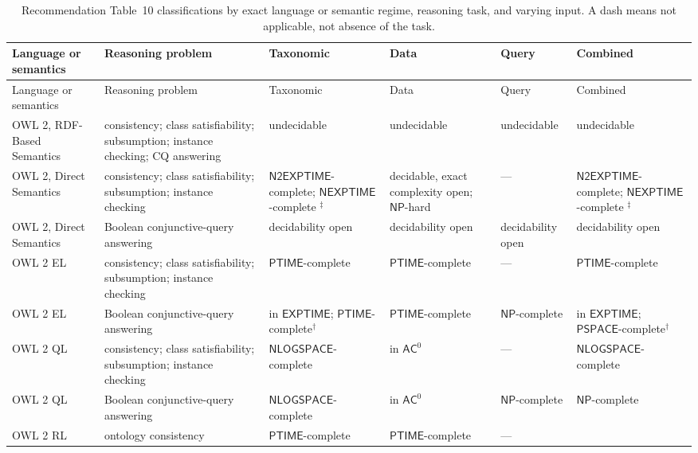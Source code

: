 \begingroup\scriptsize
\begin{longtable}{@{}p{}p{}p{}p{}p{}p{}@{}}
\caption{Recommendation Table~10 classifications by exact language or semantic
regime, reasoning task, and varying input.  A dash means not applicable, not
absence of the task.}\label{tab:p09-owl-profile-complexity}\\
\toprule
Language or semantics & Reasoning problem & Taxonomic & Data & Query & Combined \\
\midrule
\endfirsthead
\toprule
Language or semantics & Reasoning problem & Taxonomic & Data & Query & Combined \\
\midrule
\endhead
OWL 2, RDF-Based Semantics &
consistency; class satisfiability; subsumption; instance checking; CQ answering &
undecidable & undecidable & undecidable & undecidable \\
\addlinespace
OWL 2, Direct Semantics &
consistency; class satisfiability; subsumption; instance checking &
\(\mathsf{N2EXPTIME}\)-complete; \(\mathsf{NEXPTIME}\)-complete
\({}^{\ddagger}\) &
decidable, exact complexity open; \(\mathsf{NP}\)-hard &
--- &
\(\mathsf{N2EXPTIME}\)-complete; \(\mathsf{NEXPTIME}\)-complete
\({}^{\ddagger}\) \\
OWL 2, Direct Semantics & Boolean conjunctive-query answering &
decidability open & decidability open & decidability open & decidability open \\
\addlinespace
OWL 2 EL &
consistency; class satisfiability; subsumption; instance checking &
\(\mathsf{PTIME}\)-complete & \(\mathsf{PTIME}\)-complete & --- &
\(\mathsf{PTIME}\)-complete \\
OWL 2 EL & Boolean conjunctive-query answering &
in \(\mathsf{EXPTIME}\); \(\mathsf{PTIME}\)-complete\({}^{\dagger}\) &
\(\mathsf{PTIME}\)-complete &
\(\mathsf{NP}\)-complete &
in \(\mathsf{EXPTIME}\); \(\mathsf{PSPACE}\)-complete\({}^{\dagger}\) \\
\addlinespace
OWL 2 QL &
consistency; class satisfiability; subsumption; instance checking &
\(\mathsf{NLOGSPACE}\)-complete & in \(\mathsf{AC}^{0}\) & --- &
\(\mathsf{NLOGSPACE}\)-complete \\
OWL 2 QL & Boolean conjunctive-query answering &
\(\mathsf{NLOGSPACE}\)-complete & in \(\mathsf{AC}^{0}\) &
\(\mathsf{NP}\)-complete & \(\mathsf{NP}\)-complete \\
\addlinespace
OWL 2 RL & ontology consistency &
\(\mathsf{PTIME}\)-complete & \(\mathsf{PTIME}\)-complete & --- &

\end{longtable}
